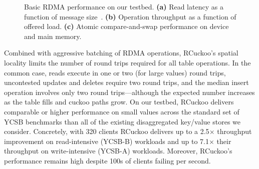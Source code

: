 \begin{figure}[t]
\begin{subfigure}{\subfigwidth}
    \end{subfigure}
    \vspace{-1em}
    \caption{Basic RDMA performance on our testbed.
    \textbf{(a)} Read latency as a function of message size~\cite{rdma-latency}.
    \textbf{(b)} Operation throughput as a function of offered load.
    \textbf{(c)} Atomic compare-and-swap performance on device and main memory.
    }
    \label{fig:rdma-benchmarks}
\end{figure}

Combined with aggressive
batching of RDMA operations, RCuckoo's spatial locality limits the
number of round trips required for all table operations.  In the
common case, reads execute in one or two (for large values) round
trips, uncontested updates and deletes require two round trips, and
the median insert operation involves only two round trips---although
the expected number increases as the table fills and cuckoo paths
grow.  On our testbed, RCuckoo delivers comparable or higher
performance on small values across the standard set of YCSB benchmarks
than all of the existing disaggregated key/value stores we consider.
Concretely, with 320 clients RCuckoo delivers up to a 2.5$\times$
throughput improvement on read-intensive (YCSB-B) workloads and up to
7.1$\times$ their throughput on write-intensive (YCSB-A) workloads.
Moreover, RCuckoo's performance remains high despite 100s of clients
failing per second.
